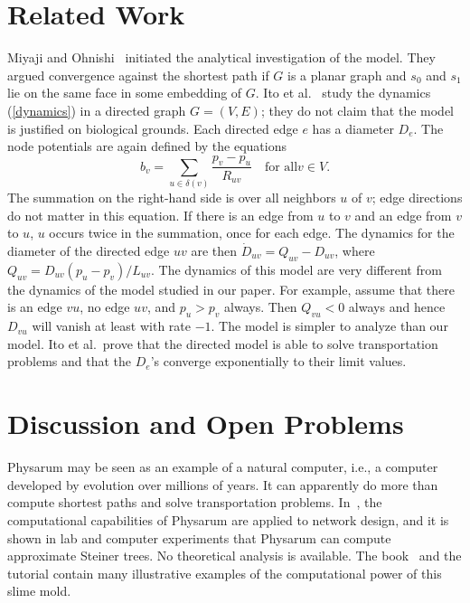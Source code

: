 \documentclass[11pt,a4paper]{article}
\renewcommand{\source}{\ensuremath{s_0}}
\renewcommand{\sink}{\ensuremath{s_1}}
\begin{document}
\section{Related Work}\label{sec: related work}
Miyaji and Ohnishi~\cite{Miyaji-Ohnish07,Miyaji-Ohnishi}
initiated the analytical investigation of the model. They argued convergence
against the shortest path if $G$ is a planar graph and 
$\source$ and $\sink$ lie on the same face in some embedding of $G$. 
Ito et al.~\cite{Ito-Convergence-Physarum} study the dynamics 
(\ref{dynamics}) in a directed graph $G = (V,E)$; they do not claim that the model is justified on  
biological grounds. Each directed edge $e$ has a
diameter $D_e$. The node potentials are again defined by the equations
\[   b_v = \sum_{u \in \delta(v)} \frac{p_v - p_u}{R_{uv}} \quad\text{for all
$v \in V$}. \]
The summation on the right-hand side is over all neighbors $u$ of $v$; edge
directions do not matter in this equation. If there is an edge from $u$ to $v$
and an edge from $v$ to $u$, $u$ occurs twice in the summation, once for each
edge. 
The dynamics for the diameter of the directed edge $uv$ are then 
$\dot{D}_{uv} = Q_{uv} - D_{uv}$, where $Q_{uv} = D_{uv}(p_u -
p_v)/L_{uv}$. The dynamics of this model are very
different from the dynamics of the model studied in our paper. For example,
assume that there is an edge $vu$, no edge $uv$, and $p_u > p_v$ always. Then
$Q_{vu} < 0$ always and hence $D_{vu}$ will vanish at least with rate $-1$. 
The model is simpler to analyze than our model. Ito et al.~prove that the
directed model is able to solve transportation problems and that the $D_e$'s
converge exponentially to their limit values. 

\section{Discussion and Open Problems}\label{sec: discussion}
Physarum may be seen as an example of a natural computer, i.e., a computer
developed by evolution over millions of years. It can apparently do more than
compute shortest paths and solve transportation problems. 
In~\cite{Tero-Takagi-etal}, the computational capabilities of Physarum
are applied to network design, and it is shown in lab and computer experiments
that Physarum can compute approximate Steiner trees. No theoretical analysis is
available. The book~\cite{PhysarumBook} and the tutorial \cite{PhysarumTutorial} contain many illustrative examples of the computational power of this slime mold. 
\end{document}
